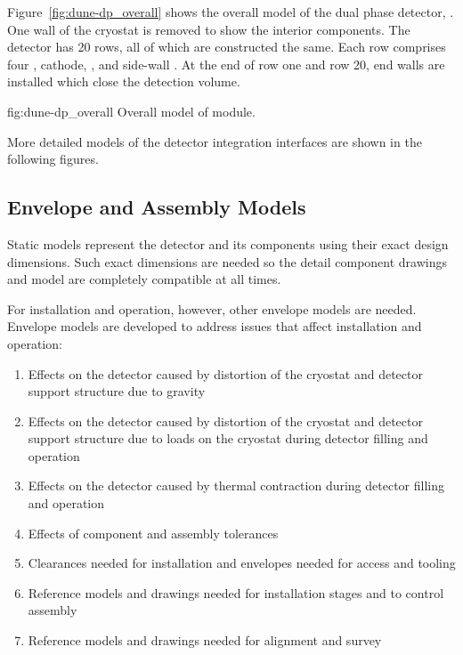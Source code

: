 Figure~\ref{fig:dune-dp_overall} shows the overall model of the dual
phase detector, . One wall of the cryostat is removed to
show the interior components. The detector has 20 rows, all of which
are constructed the same. Each row comprises four ,
cathode, ,  and side-wall .  At the
end of row one and row 20, end walls are installed which close the
detection volume.
\begin{dunefigure}{fig:dune-dp_overall}
  {Overall model of  module.}
\end{dunefigure}


More detailed models of the  detector integration
interfaces are shown in the following figures.

\subsection{Envelope and Assembly Models}
\label{sec:fdsp-coord-integ-envelope}

Static models represent the detector and its components using their exact
design dimensions. Such exact dimensions are needed so the
detail component drawings and model are completely compatible at all
times.


For installation and operation, however, other envelope models are
needed. Envelope models are developed to address issues that affect
installation and operation:
\begin{enumerate}
 \item Effects on the detector caused by distortion of the cryostat
   and detector support structure due to gravity
 \item Effects on the detector caused by distortion of the cryostat
   and detector support structure due to loads on the cryostat during
   detector filling and operation
 \item Effects on the detector caused by thermal contraction during
   detector filling and operation
 \item Effects of component and
   assembly tolerances
 \item Clearances needed for installation and envelopes needed for
   access and tooling
 \item Reference models and drawings needed for installation stages
   and to control assembly
 \item Reference models and drawings needed for alignment and survey
\end{enumerate}


